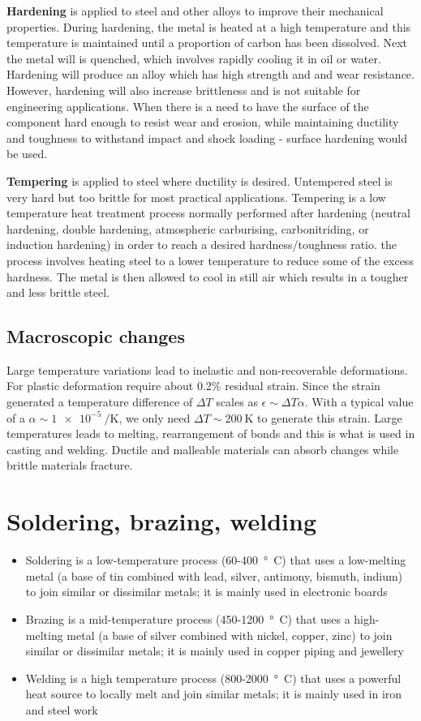 \textbf{Hardening} is applied to steel and other alloys to improve their mechanical properties. During hardening, the metal is heated at a high temperature and this temperature is maintained until a proportion of carbon has been dissolved. Next the metal will is quenched, which involves rapidly cooling it in oil or water. Hardening will produce an alloy which has high strength and and wear resistance. However, hardening will also increase brittleness and is not suitable for engineering applications. When there is a need to have the surface of the component hard enough to resist wear and erosion, while maintaining ductility and toughness to withstand impact and shock loading - surface hardening would be used.

\textbf{Tempering} is applied to steel where ductility is desired. Untempered steel is very hard but too brittle for most practical applications. Tempering is a low temperature heat treatment process normally performed after hardening (neutral hardening, double hardening, atmospheric carburising, carbonitriding, or induction hardening) in order to reach a desired hardness/toughness ratio. the process involves heating steel to a lower temperature to reduce some of the excess hardness. The metal is then allowed to cool in still air which results in a tougher and less brittle steel.
\subsection{Macroscopic changes}
Large temperature variations lead to inelastic and non-recoverable deformations. For plastic deformation require about 0.2\% residual strain. Since the strain generated a temperature difference of $\Delta T$ scales as $\epsilon \sim \Delta T \alpha$. With a typical value of a $\alpha \sim \SI{1e-5}{\per\kelvin}$, we only need $\Delta T \sim \SI{200}{\kelvin}$ to generate this strain. Large temperatures leads to melting, rearrangement of bonds and this is what is used in casting and welding. Ductile and malleable materials can absorb changes while brittle materials fracture.
\section{Soldering, brazing, welding}
\begin{itemize}
    \item Soldering is a low-temperature process (60-\SI{400}{\degree C}) that uses a low-melting metal (a base of tin combined with lead, silver, antimony, bismuth, indium) to join similar or dissimilar metals; it is mainly used in electronic boards
    \item Brazing is a mid-temperature process (450-\SI{1200}{\degree C}) that uses a high-melting metal (a base of silver combined with nickel, copper, zinc) to join similar or dissimilar metals; it is mainly used in copper piping and jewellery
    \item Welding is a high temperature process (800-\SI{2000}{\degree C}) that uses a powerful heat source to locally melt and join similar metals; it is mainly used in iron and steel work
\end{itemize}
